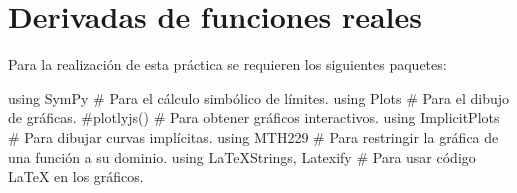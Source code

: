 \documentclass[
  a4paper,
]{scrreport}
\newenvironment{Shaded}{\begin{snugshade}}{\end{snugshade}}
\newcommand{\BuiltInTok}[1]{\textcolor[rgb]{0.00,0.23,0.31}{#1}}
\newcommand{\CommentTok}[1]{\textcolor[rgb]{0.37,0.37,0.37}{#1}}
\newcommand{\ImportTok}[1]{\textcolor[rgb]{0.00,0.46,0.62}{#1}}
\newcommand{\NormalTok}[1]{\textcolor[rgb]{0.00,0.23,0.31}{#1}}
\theoremstyle{definition}
\theoremstyle{remark}
\begin{document}

\hypertarget{derivadas-de-funciones-reales}{%
\chapter{Derivadas de funciones
reales}\label{derivadas-de-funciones-reales}}

Para la realización de esta práctica se requieren los siguientes
paquetes:

\begin{Shaded}
\begin{Highlighting}[]
\ImportTok{using} \BuiltInTok{SymPy  }\CommentTok{\# Para el cálculo simbólico de límites.}
\ImportTok{using} \BuiltInTok{Plots  }\CommentTok{\# Para el dibujo de gráficas.}
\CommentTok{\#plotlyjs() \# Para obtener gráficos interactivos.}
\ImportTok{using} \BuiltInTok{ImplicitPlots }\CommentTok{\# Para dibujar curvas implícitas.}
\ImportTok{using} \BuiltInTok{MTH229 }\CommentTok{\# Para restringir la gráfica de una función a su dominio.}
\ImportTok{using} \BuiltInTok{LaTeXStrings}\NormalTok{, }\BuiltInTok{Latexify  }\CommentTok{\# Para usar código LaTeX en los gráficos.}
\end{Highlighting}
\end{Shaded}
\end{document}
